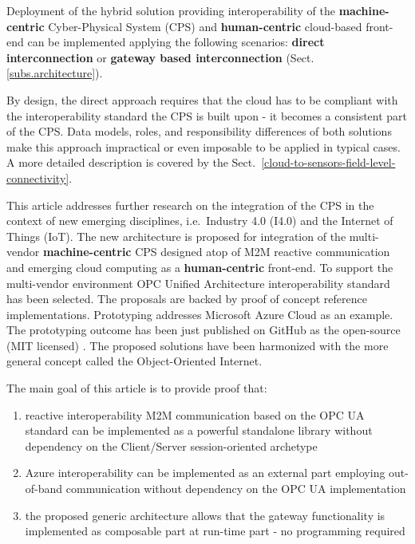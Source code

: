 \documentclass{article}
\begin{document}
Deployment of the hybrid solution providing interoperability of the \textbf{machine-centric} Cyber-Physical System (CPS) and \textbf{human-centric} cloud-based front-end can be implemented applying the following scenarios: \textbf{direct interconnection} or \textbf{gateway based interconnection} (Sect. \ref*{subs.architecture}).

By design, the direct approach requires that the cloud has to be compliant with the interoperability standard the CPS is built upon - it becomes a consistent part of the CPS. Data models, roles, and responsibility differences of both solutions make this approach impractical or even imposable to be applied in typical cases. A more detailed description is covered by the Sect.~\ref*{cloud-to-sensors-field-level-connectivity}.

This article addresses further research on the integration of the CPS in the context of new emerging disciplines, i.e.~Industry 4.0 (I4.0) and the Internet of Things (IoT). The new architecture is proposed for integration of the multi-vendor \textbf{machine-centric} CPS designed atop of M2M reactive communication and emerging cloud computing as a \textbf{human-centric} front-end. To support the multi-vendor environment OPC Unified Architecture \cite{LiteratureSurveyOnOpenPlatformCommunications} interoperability standard has been selected. The proposals are backed by proof of concept reference implementations. Prototyping addresses Microsoft Azure Cloud as an example. The prototyping outcome has been just published on GitHub as the open-source (MIT licensed) . The proposed solutions have been harmonized with the more general concept called the Object-Oriented Internet.

The main goal of this article is to provide proof that:

\begin{enumerate}
      \item  reactive interoperability M2M communication based on the OPC UA standard can be implemented as a powerful standalone library without dependency on the Client/Server session-oriented archetype
      \item Azure interoperability can be implemented as an external part employing out-of-band communication without dependency on the OPC UA implementation
      \item the proposed generic architecture allows that the gateway functionality is implemented as composable part at run-time part - no programming required
\end{enumerate}
\end{document}
